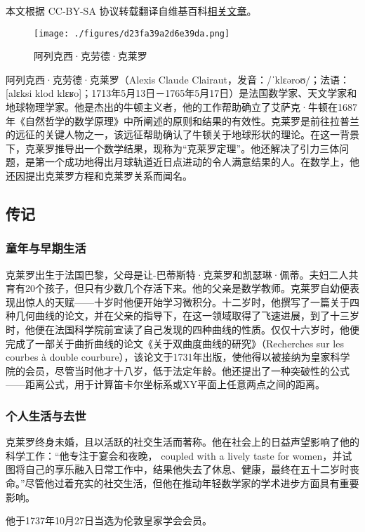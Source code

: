 
本文根据 CC-BY-SA 协议转载翻译自维基百科\href{https://en.wikipedia.org/wiki/Alexis_Clairaut}{相关文章}。

\begin{figure}[ht]
\centering
\texttt{[image: ./figures/d23fa39a2d6e39da.png]}
\caption{阿列克西·克劳德·克莱罗} \label{fig_Alexis_1}
\end{figure}
阿列克西·克劳德·克莱罗（Alexis Claude Clairaut，发音：/ˈklɛəroʊ/；法语：[alɛksi klod klɛʁo]；1713年5月13日－1765年5月17日）是法国数学家、天文学家和地球物理学家。他是杰出的牛顿主义者，他的工作帮助确立了艾萨克·牛顿在1687年《自然哲学的数学原理》中所阐述的原则和结果的有效性。克莱罗是前往拉普兰的远征的关键人物之一，该远征帮助确认了牛顿关于地球形状的理论。在这一背景下，克莱罗推导出一个数学结果，现称为“克莱罗定理”。他还解决了引力三体问题，是第一个成功地得出月球轨道近日点进动的令人满意结果的人。在数学上，他还因提出克莱罗方程和克莱罗关系而闻名。
\subsection{传记}  
\subsubsection{童年与早期生活}  
克莱罗出生于法国巴黎，父母是让-巴蒂斯特·克莱罗和凯瑟琳·佩蒂。夫妇二人共育有20个孩子，但只有少数几个存活下来。他的父亲是数学教师。克莱罗自幼便表现出惊人的天赋——十岁时他便开始学习微积分。十二岁时，他撰写了一篇关于四种几何曲线的论文，并在父亲的指导下，在这一领域取得了飞速进展，到了十三岁时，他便在法国科学院前宣读了自己发现的四种曲线的性质。仅仅十六岁时，他便完成了一部关于曲折曲线的论文《关于双曲度曲线的研究》（Recherches sur les courbes à double courbure），该论文于1731年出版，使他得以被接纳为皇家科学院的会员，尽管当时他才十八岁，低于法定年龄。他还提出了一种突破性的公式——距离公式，用于计算笛卡尔坐标系或XY平面上任意两点之间的距离。
\subsubsection{个人生活与去世}  
克莱罗终身未婚，且以活跃的社交生活而著称。他在社会上的日益声望影响了他的科学工作：“他专注于宴会和夜晚， coupled with a lively taste for women，并试图将自己的享乐融入日常工作中，结果他失去了休息、健康，最终在五十二岁时丧命。”尽管他过着充实的社交生活，但他在推动年轻数学家的学术进步方面具有重要影响。

他于1737年10月27日当选为伦敦皇家学会会员。

